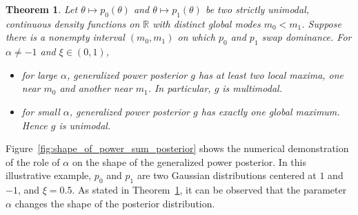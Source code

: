 \documentclass[12pt]{article}
\newtheorem{theorem}{Theorem}
\begin{document}
\begin{theorem}
    \label{thm:shape_of_power_sum_posterior}
    Let $\theta \mapsto p_0(\theta)$ and $\theta \mapsto p_1(\theta)$ be two strictly unimodal, continuous density functions on $\mathbb{R}$ with distinct global modes $m_0 < m_1$.
    Suppose there is a nonempty interval $(m_0, m_1)$ on which $p_0$ and $p_1$ swap dominance.
    For $\alpha \neq -1$ and $\xi \in (0, 1)$,
    \begin{itemize}
        \item[i)] for large $\alpha$, generalized power posterior $g$ has at least two local maxima, one near $m_0$ and another near $m_1$. In particular, $g$ is multimodal.
        \item[ii)] for small $\alpha$, generalized power posterior $g$ has exactly one global maximum. Hence $g$ is unimodal.
    \end{itemize}
\end{theorem}

Figure~\ref{fig:shape_of_power_sum_posterior} shows the numerical demonstration of the role of $\alpha$ on the shape of the generalized power posterior.
In this illustrative example, $p_0$ and $p_1$ are two Gaussian distributions centered at $1$ and $-1$, and $\xi = 0.5$.
As stated in Theorem~\ref{thm:shape_of_power_sum_posterior}, it can be observed that the parameter $\alpha$ changes the shape of the posterior distribution.
\end{document}
